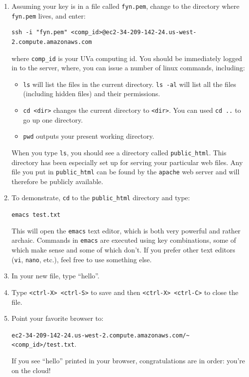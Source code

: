 \documentclass[11pt]{article} %
\begin{document}
\begin{enumerate}
\item Assuming your key is in a file called \verb|fyn.pem|, change to the directory where \verb|fyn.pem| lives, and enter:

\begin{verbatim}
ssh -i "fyn.pem" <comp_id>@ec2-34-209-142-24.us-west-2.compute.amazonaws.com
\end{verbatim}

where \verb|comp_id| is your UVa computing id. You should be immediately logged in to the server, where, you can issue a number of linux commands, including:

\begin{itemize}
\item \verb|ls| will list the files in the current directory. \verb|ls -al| will list all the files (including hidden files) and their permissions.
\item \verb|cd <dir>| changes the current directory to \verb|<dir>|. You can used \verb|cd ..| to go up one directory.
\item \verb|pwd| outputs your present working directory.
\end{itemize}

When you type \verb|ls|, you should see a directory called \verb|public_html|. This directory has been especially set up for serving your particular web files. Any file you put in \verb|public_html| can be found by the \verb|apache| web server and will therefore be publicly available. 

\item To demonstrate, \verb|cd| to the \verb|public_html| directory and type:

\verb|emacs test.txt|

This will open the \verb|emacs| text editor, which is both very powerful and rather archaic. Commands in \verb|emacs| are executed using key combinations, some of which make sense and some of which don’t. If you prefer other text editors (\verb|vi|, \verb|nano|, etc.), feel free to use something else.

\item In your new file, type “hello”. 
\item Type \verb|<ctrl-X> <ctrl-S>| to save and then \verb|<ctrl-X> <ctrl-C>| to close the file. 
\item Point your favorite browser to:

\verb|ec2-34-209-142-24.us-west-2.compute.amazonaws.com/~<comp_id>/test.txt|. 
 
If you see “hello” printed in your browser, congratulations are in order: you’re on the cloud!
\end{enumerate}
\end{document}
